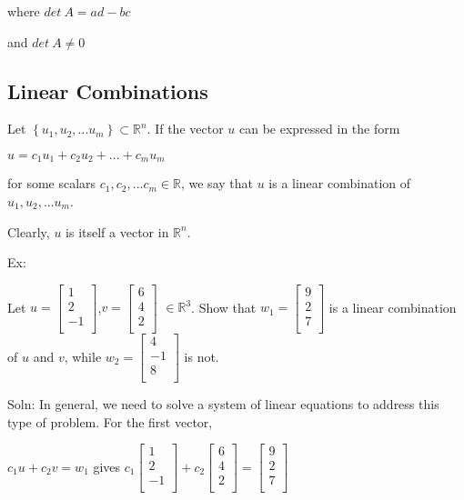 \documentclass{extarticle}
\begin{document}
\begin{multicols}{4}
where $det\ A=ad-bc$

and $det\ A\neq0$

\subsection{Linear Combinations}
Let $\left\{u_1,u_2,... u_m\right\}\subset{\mathbb{R}}^n$. If the vector $u$ can be expressed in the form

$u = c_1u_1+c_2u_2+...+ c_mu_m$

for some scalars $c_1,c_2,... c_m\in\mathbb{R}$, we say that $u$ is a linear combination of $u_1,u_2,... u_m$.

Clearly, $u$ is itself a vector in ${\mathbb{R}}^n$.

\begin{tcolorbox}[enhanced jigsaw,sharp corners,coltext=black,colback=BurntOrange!25!white,boxrule=0pt,breakable,size=minimal]

Ex: 

Let 
$u=\left[\begin{matrix}1\\2\\-1\\\end{matrix}\right]$,$v=\left[\begin{matrix}6\\4\\2\\\end{matrix}\right]$ $\in{\mathbb{R}}^3$.
Show that
$w_1=\left[\begin{matrix}9\\2\\7\\\end{matrix}\right]$
is a linear combination of $u$ and $v$, while $w_2=\left[\begin{matrix}4\\-1\\8\\\end{matrix}\right]$ is not.



Soln: In general, we need to solve a system of linear equations to address this type of problem. For the first vector,


$c_1u+c_2v=w_1$ gives 
$c_1\left[\begin{matrix}1\\2\\-1\\\end{matrix}\right]+c_2\left[\begin{matrix}6\\4\\2\\\end{matrix}\right]=\left[\begin{matrix}9\\2\\7\\\end{matrix}\right]$


\end{tcolorbox}
\end{multicols}
\end{document}
